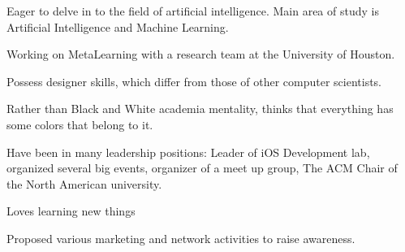 \begin{cvletter}
\medskip
\begin{cvitems}
        \item {Eager to delve in to the field of artificial intelligence. Main area of study is Artificial Intelligence and Machine Learning.}
         \item{Working on MetaLearning with a research team at the University of Houston.} 
         \item{Possess designer skills, which differ from those of other computer scientists.} 
         \item{Rather than Black and White academia mentality, thinks that everything has some colors that belong to it. }
         \item{Have been in many leadership positions: Leader of iOS Development lab, organized several big events,  organizer of a meet up group, The ACM Chair of the North American university.} 
         \item{Loves learning new things}
        \item {Proposed various marketing and network activities to raise awareness.}
      \end{cvitems}
\end{cvletter}